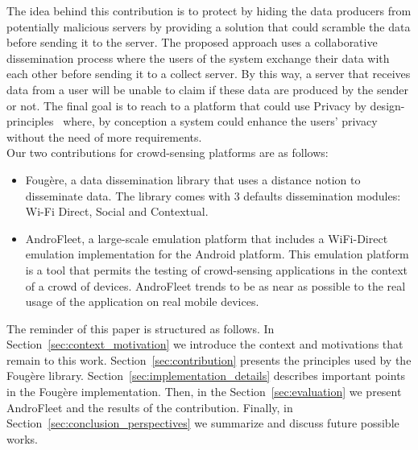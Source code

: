 The idea behind this contribution is to protect by hiding the data producers from potentially malicious servers by providing a solution that could scramble the data before sending it to the server.
The proposed approach uses a collaborative dissemination process where the users of the system exchange their data with each other before sending it to a collect server.
By this way, a server that receives data from a user will be unable to claim if these data are produced by the sender or not.
The final goal is to reach to a platform that could use Privacy by design-principles~\cite{langheinrich2001privacy} where, by conception a system could enhance the users' privacy without the need of more requirements.
\\

Our two contributions for crowd-sensing platforms are as follows:
\begin{itemize}
	\item Foug\`ere, a data dissemination library that uses a distance notion to disseminate data.
	The library comes with 3 defaults dissemination modules: Wi-Fi Direct, Social and Contextual.
	\item AndroFleet, a large-scale emulation platform that includes a WiFi-Direct emulation implementation for the Android platform. 
	This emulation platform is a tool that permits the testing of crowd-sensing applications in the context of a crowd of devices. 
	AndroFleet trends to be as near as possible to the real usage of the application on real mobile devices.
\end{itemize} 


The reminder of this paper is structured as follows.
In Section~\ref{sec:context_motivation} we introduce the context and motivations that remain to this work.
Section~\ref{sec:contribution} presents the principles used by the Foug\`ere library.
Section~\ref{sec:implementation_details} describes important points in the Foug\`ere implementation.
Then, in the Section~\ref{sec:evaluation} we present AndroFleet and the results of the contribution.
Finally, in Section~\ref{sec:conclusion_perspectives} we summarize and discuss future possible works.

